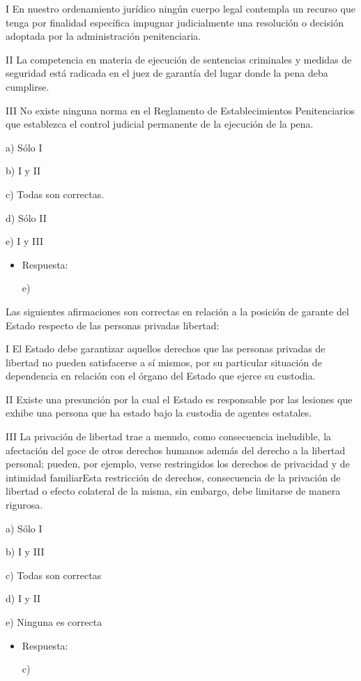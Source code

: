 \documentclass[letterpaper, 11pt]{article}
\begin{document}
I En nuestro ordenamiento jurídico ningún cuerpo legal contempla un
recurso que tenga por finalidad específica impugnar judicialmente una
resolución o decisión adoptada por la administración penitenciaria.

II La competencia en materia de ejecución de sentencias criminales y
medidas de seguridad está radicada en el juez de garantía del lugar
donde la pena deba cumplirse.

III No existe ninguna norma en el Reglamento de Establecimientos
Penitenciarios que establezca el control judicial permanente de la
ejecución de la pena.

a) Sólo I

b) I y II

c) Todas son correctas.


d) Sólo II

e) I y III

\begin{itemize}
\item Respuesta:

e)
\end{itemize}


Las siguientes afirmaciones son correctas en relación a la posición de
garante del Estado respecto de las personas privadas libertad:


I El Estado debe garantizar aquellos derechos que las personas
privadas de libertad no pueden satisfacerse a sí mismos, por su
particular situación de dependencia en relación con el órgano del
Estado que ejerce su custodia.

II Existe una presunción por la cual el Estado es responsable por las
lesiones que exhibe una persona que ha estado bajo la custodia de
agentes estatales.

III La privación de libertad trae a menudo, como consecuencia
ineludible, la afectación del goce de otros derechos humanos además
del derecho a la libertad personal; pueden, por ejemplo, verse
restringidos los derechos de privacidad y de intimidad familiarEsta
restricción de derechos, consecuencia de la privación de libertad o
efecto colateral de la misma, sin embargo, debe limitarse de manera
rigurosa.


a) Sólo I

b) I y III

c) Todas son correctas

d) I y II

e) Ninguna es correcta

\begin{itemize}
\item Respuesta:

c)
\end{itemize}
\end{document}
